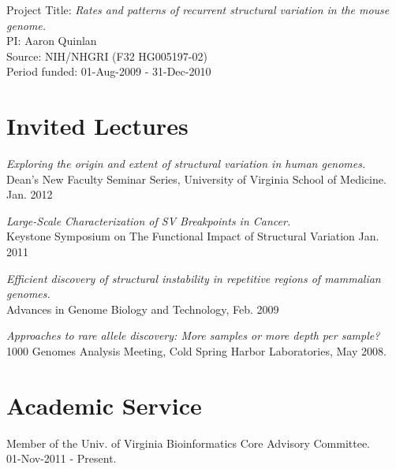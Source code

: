 \documentclass[margin,line]{cv}
\begin{document}
\begin{resume}
    \vspace{-2mm}
    Project Title: \textit{Rates and patterns of recurrent structural variation in the mouse genome.}\\
    PI: Aaron Quinlan\\
    Source: NIH/NHGRI (F32 HG005197-02)\\
    Period funded: 01-Aug-2009 - 31-Dec-2010

    \section{\mysidestyle Invited Lectures}
    
    \textit{Exploring the origin and extent of structural variation in human genomes.} \\
    Dean’s New Faculty Seminar Series, University of Virginia School of Medicine. Jan. 2012
    
    \vspace{-2mm}
    \textit{Large-Scale Characterization of SV Breakpoints in Cancer.} \\
    Keystone Symposium on The Functional Impact of Structural Variation Jan. 2011

    \vspace{-2mm}
    \textit{Efficient discovery of structural instability in repetitive regions of mammalian genomes.} \\
    Advances in Genome Biology and Technology, Feb. 2009

    \vspace{-2mm}
    \textit{Approaches to rare allele discovery: More samples or more depth per sample? } \\
    1000 Genomes Analysis Meeting, Cold Spring Harbor Laboratories, May 2008.
    
    \section{\mysidestyle Academic Service}
    
    Member of the Univ. of Virginia Bioinformatics Core Advisory Committee.\\
    01-Nov-2011 - Present.
    

\end{resume}
\end{document}
